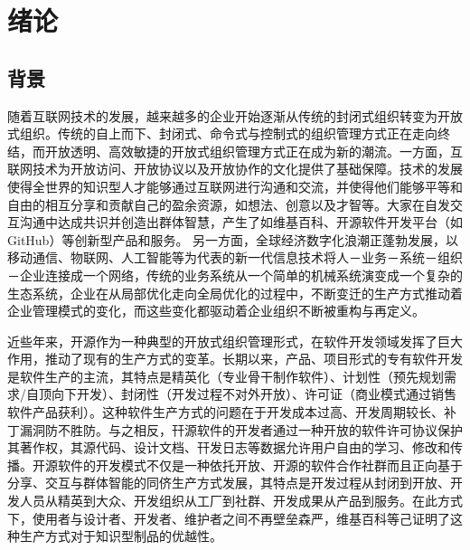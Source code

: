 
\section{绪论}
 
\subsection{背景}
\par 随着互联网技术的发展，越来越多的企业开始逐渐从传统的封闭式组织转变为开放式组织。传统的自上而下、封闭式、命令式与控制式的组织管理方式正在走向终结，而开放透明、高效敏捷的开放式组织管理方式正在成为新的潮流。一方面，互联网技术为开放访问、开放协议以及开放协作的文化提供了基础保障。技术的发展使得全世界的知识型人才能够通过互联网进行沟通和交流，并使得他们能够平等和自由的相互分享和贡献自己的盈余资源，如想法、创意以及才智等。大家在自发交互沟通中达成共识并创造出群体智慧，产生了如维基百科、开源软件开发平台（如GitHub）等创新型产品和服务\cite{王璐2017开放式创新的协同演化机制研究}。 另一方面，全球经济数字化浪潮正蓬勃发展，以移动通信、物联网、人工智能等为代表的新一代信息技术将人－业务－系统－组织－企业连接成一个网络，传统的业务系统从一个简单的机械系统演变成一个复杂的生态系统，企业在从局部优化走向全局优化的过程中，不断变迁的生产方式推动着企业管理模式的变化，而这些变化都驱动着企业组织不断被重构与再定义。

\par 近些年来，开源作为一种典型的开放式组织管理形式，在软件开发领域发挥了巨大作用，推动了现有的生产方式的变革。长期以来，产品、项目形式的专有软件开发是软件生产的主流，其特点是精英化（专业骨干制作软件）、计划性（预先规划需求/自顶向下开发）、封闭性（开发过程不对外开放）、许可证（商业模式通过销售软件产品获利）。这种软件生产方式的问题在于开发成本过高、开发周期较长、补丁漏洞防不胜防。与之相反，幵源软件的开发者通过一种开放的软件许可协议保护其著作权，其源代码、设计文档、幵发日志等数据允许用户自由的学习、修改和传播。开源软件的开发模式不仅是一种依托开放、开源的软件合作社群而且正向基于分享、交互与群体智能的同侪生产方式发展，其特点是开发过程从封闭到开放、开发人员从精英到大众、开发组织从工厂到社群、开发成果从产品到服务。在此方式下，使用者与设计者、开发者、维护者之间不再壁垒森严，维基百科等己证明了这种生产方式对于知识型制品的优越性。\cite{李其锋2014面向开源社区的开发者群体行为分析方法}

